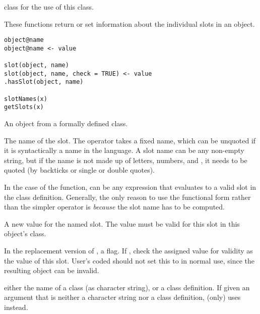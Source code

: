 %
\begin{SeeAlso}\relax
class  for the use of this class.
\end{SeeAlso}
%
\begin{Description}\relax
These functions return or set information about the individual slots
in an object.
\end{Description}
%
\begin{Usage}
\begin{verbatim}
object@name
object@name <- value

slot(object, name)
slot(object, name, check = TRUE) <- value
.hasSlot(object, name)

slotNames(x)
getSlots(x)
\end{verbatim}
\end{Usage}
%
\begin{Arguments}
\begin{ldescription}
\item[\code{object}] An object from a formally defined class.
\item[\code{name}] The name of the slot. The operator
takes a fixed name, which can be unquoted if it is syntactically a
name in the language.  A slot name can be any non-empty string, but
if the name is not made up of letters, numbers, and , it
needs to be quoted (by backticks or single or double quotes).

In the case of the  function,  can be any
expression that evaluates to a valid slot in the class definition.
Generally, the only reason to use the functional form rather than
the simpler operator is \emph{because} the slot name has to be computed.

\item[\code{value}] A new value for the named slot.  The value must be
valid for this slot in this object's class.
\item[\code{check}] In the replacement version of , a flag.  If
, check the assigned value for validity
as the value of this slot.  User's coded should not set this to
 in normal use, since the resulting object can be invalid.

\item[\code{x}] either the name of a class (as character string), or a class
definition.  If given an argument that is neither a character string
nor a class definition,  (only) uses 
instead.
\end{ldescription}
\end{Arguments}
